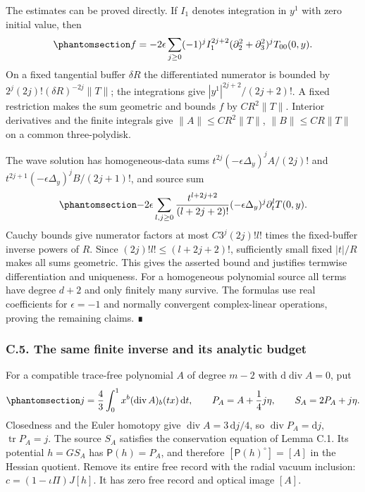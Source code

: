 \documentclass[
  english,
  11pt,
  reqno]{amsart}
\begin{document}
The estimates can be proved directly. If \(I_1\) denotes integration in
\(y^1\) with zero initial value, then
\begin{equation}\protect\phantomsection\label{eq:gg-linear-source-poisson-series}{
 f=-2\epsilon\sum_{j\ge0}(-1)^j
       I_1^{2j+2}(\partial_2^2+\partial_3^2)^jT_{00}(0,y).
}\end{equation} On a fixed tangential buffer \(\delta R\) the
differentiated numerator is bounded by
\(2^j(2j)!(\delta R)^{-2j}\|T\|\); the integrations give
\(|y^1|^{2j+2}/(2j+2)!\). A fixed restriction makes the sum geometric
and bounds \(f\) by \(CR^2\|T\|\). Interior derivatives and the finite
integrals give \(\|A\|\le CR^2\|T\|\), \(\|B\|\le CR\|T\|\) on a common
three-polydisk.

The wave solution has homogeneous-data sums
\(t^{2j}(-\epsilon\Delta_y)^jA/(2j)!\) and
\(t^{2j+1}(-\epsilon\Delta_y)^jB/(2j+1)!\), and source sum
\begin{equation}\protect\phantomsection\label{eq:gg-linear-source-wave-series}{
 -2\epsilon\sum_{l,j\ge0}
 \frac{t^{l+2j+2}}{(l+2j+2)!}
              (-\epsilon\Delta_y)^j\partial_t^lT(0,y).
}\end{equation} Cauchy bounds give numerator factors at most
\(C3^j(2j)!l!\) times the fixed-buffer inverse powers of \(R\). Since
\((2j)!l!\le(l+2j+2)!\), sufficiently small fixed \(|t|/R\) makes all
sums geometric. This gives the asserted bound and justifies termwise
differentiation and uniqueness. For a homogeneous polynomial source all
terms have degree \(d+2\) and only finitely many survive. The formulas
use real coefficients for \(\epsilon=-1\) and normally convergent
complex-linear operations, proving the remaining claims. ∎

\protect{}\label{sec:gg-same-symbol-inverse-budget}

\subsubsection{C.5. The same finite inverse and its analytic
budget}\label{c.5.-the-same-finite-inverse-and-its-analytic-budget}

For a compatible trace-free polynomial \(A\) of degree \(m-2\) with
\(\mathrm d\operatorname{div}A=0\), put
\begin{equation}\protect\phantomsection\label{eq:gg-compatible-schouten-source}{
 j=\frac43\int_0^1x^b(\operatorname{div}A)_b(tx)\,\mathrm dt,
 \qquad P_A=A+\frac14j\eta,\qquad S_A=2P_A+j\eta .
}\end{equation} Closedness and the Euler homotopy give
\(\operatorname{div}A=3\,\mathrm dj/4\), so
\(\operatorname{div}P_A=\mathrm dj\), \(\operatorname{tr}P_A=j\). The
source \(S_A\) satisfies the conservation equation of Lemma C.1. Its
potential \(h=GS_A\) has \(\mathsf P(h)=P_A\), and therefore
\([\mathsf P(h)^\circ]=[A]\) in the Hessian quotient. Remove its entire
free record with the radial vacuum inclusion: \(c=(1-\iota\Pi)J[h]\). It
has zero free record and optical image \([A]\).
\end{document}
